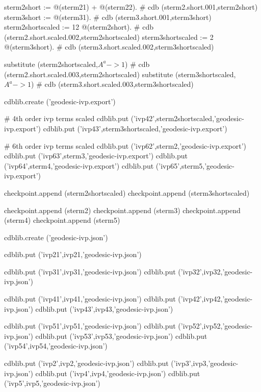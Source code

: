 \documentclass[12pt]{cdblatex}
\begin{document}
\begin{cadabra}
   sterm2short := @(sterm21) + @(sterm22).             # cdb (sterm2.short.001,sterm2short)
   sterm3short := @(sterm31).                          # cdb (sterm3.short.001,sterm3short)
   sterm2shortscaled := 12 @(sterm2short).             # cdb (sterm2.short.scaled.002,sterm2shortscaled)
   sterm3shortscaled :=  2 @(sterm3short).             # cdb (sterm3.short.scaled.002,sterm3shortscaled)

   substitute (sterm2shortscaled,$A^{a}->1$)           # cdb (sterm2.short.scaled.003,sterm2shortscaled)
   substitute (sterm3shortscaled,$A^{a}->1$)           # cdb (sterm3.short.scaled.003,sterm3shortscaled)

   cdblib.create ('geodesic-ivp.export')

   # 4th order ivp terms scaled
   cdblib.put ('ivp42',sterm2shortscaled,'geodesic-ivp.export')
   cdblib.put ('ivp43',sterm3shortscaled,'geodesic-ivp.export')

   # 6th order ivp terms scaled
   cdblib.put ('ivp62',sterm2,'geodesic-ivp.export')
   cdblib.put ('ivp63',sterm3,'geodesic-ivp.export')
   cdblib.put ('ivp64',sterm4,'geodesic-ivp.export')
   cdblib.put ('ivp65',sterm5,'geodesic-ivp.export')

   checkpoint.append (sterm2shortscaled)
   checkpoint.append (sterm3shortscaled)

   checkpoint.append (sterm2)
   checkpoint.append (sterm3)
   checkpoint.append (sterm4)
   checkpoint.append (sterm5)

   cdblib.create ('geodesic-ivp.json')

   cdblib.put ('ivp21',ivp21,'geodesic-ivp.json')

   cdblib.put ('ivp31',ivp31,'geodesic-ivp.json')
   cdblib.put ('ivp32',ivp32,'geodesic-ivp.json')

   cdblib.put ('ivp41',ivp41,'geodesic-ivp.json')
   cdblib.put ('ivp42',ivp42,'geodesic-ivp.json')
   cdblib.put ('ivp43',ivp43,'geodesic-ivp.json')

   cdblib.put ('ivp51',ivp51,'geodesic-ivp.json')
   cdblib.put ('ivp52',ivp52,'geodesic-ivp.json')
   cdblib.put ('ivp53',ivp53,'geodesic-ivp.json')
   cdblib.put ('ivp54',ivp54,'geodesic-ivp.json')

   cdblib.put ('ivp2',ivp2,'geodesic-ivp.json')
   cdblib.put ('ivp3',ivp3,'geodesic-ivp.json')
   cdblib.put ('ivp4',ivp4,'geodesic-ivp.json')
   cdblib.put ('ivp5',ivp5,'geodesic-ivp.json')
\end{cadabra}
\end{document}
